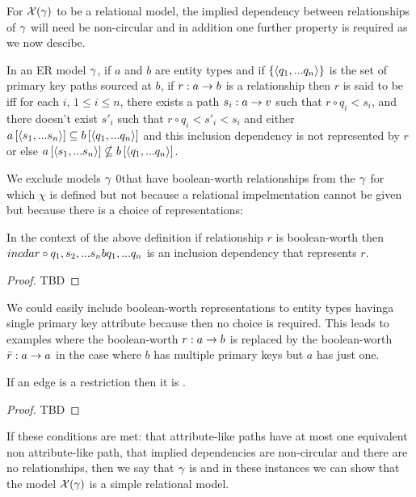 For $\mathcal{X}(\gamma)$ to be a relational model, the implied dependency between relationships of $\gamma$ will need be non-circular
and in addition one further property is required as we now descibe.


\begin{definition}
In an  ER model $\gamma$, if $a$ and $b$ are entity types and if $\left\{\langle q_1,...q_n\rangle\right\}$ is the set of primary key paths sourced at $b$, if $r: a \rightarrow b$ is a relationship then $r$ is said to be  
iff for each $i$, $1 \leq i \leq n$, there exists a path $s_i: a \rightarrow v$ such that $r \circ q_i < s_i$,
and there doesn't exist $s'_i$ such that $r \circ q_i < s'_i <s_i$ and  either
$a\left[\langle s_1,...s_n\rangle\right]\subseteq b\left[\langle q_1,...q_n\rangle\right]$ and this inclusion dependency is not represented by
$r$ or else $a\left[\langle s_1,...s_n\rangle\right]\nsubseteq b\left[\langle q_1,...q_n\rangle\right]$.
\end{definition}

We exclude models $\gamma$ 0that have boolean-worth relationships from the $\gamma$ for which $\chi$ is defined but not because a relational impelmentation cannot be given but because there is a choice of representations: 
\begin{lemma}
In the context of the above definition if relationship $r$ is boolean-worth
then $incd{a}{r \circ q_1,s_2,...s_n}{b}{q_1,...q_n}$ is an inclusion dependency that represents $r$. 
\end{lemma}
\begin{proof}
TBD
\end{proof}
We could easily include boolean-worth representations to entity types havinga single primary key attribute because then no choice is required.
This leads to examples where the boolean-worth $r: a \rightarrow b$ is replaced by the boolean-worth $\bar{r}: a \rightarrow a$ in the case where $b$ has multiple primary keys but $a$ has just one.  

\begin{lemma}
If an edge is a restriction then it is  .
\end{lemma}
\begin{proof}
TBD
\end{proof}

If these conditions are met: that attribute-like paths have at most one equivalent non attribute-like path, that implied dependencies are non-circular and there are no   relationships, then we say that $\gamma$ is  and in these instances we can show that 
the model $\mathcal{X}(\gamma)$ is a simple relational model. 

